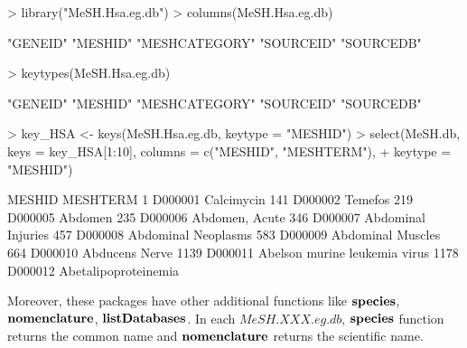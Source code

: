 \documentclass[11pt]{article}
\begin{document}
\begin{center}
\begin{Schunk}
\begin{Sinput}
> library("MeSH.Hsa.eg.db")
> columns(MeSH.Hsa.eg.db)
\end{Sinput}
\begin{Soutput}
[1] "GENEID"       "MESHID"       "MESHCATEGORY" "SOURCEID"     "SOURCEDB"    
\end{Soutput}
\begin{Sinput}
> keytypes(MeSH.Hsa.eg.db)
\end{Sinput}
\begin{Soutput}
[1] "GENEID"       "MESHID"       "MESHCATEGORY" "SOURCEID"     "SOURCEDB"    
\end{Soutput}
\begin{Sinput}
> key_HSA <- keys(MeSH.Hsa.eg.db, keytype = "MESHID")
> select(MeSH.db, keys = key_HSA[1:10], columns = c("MESHID", "MESHTERM"), 
+     keytype = "MESHID")
\end{Sinput}
\begin{Soutput}
      MESHID                      MESHTERM
1    D000001                    Calcimycin
141  D000002                       Temefos
219  D000005                       Abdomen
235  D000006                Abdomen, Acute
346  D000007            Abdominal Injuries
457  D000008           Abdominal Neoplasms
583  D000009             Abdominal Muscles
664  D000010                Abducens Nerve
1139 D000011 Abelson murine leukemia virus
1178 D000012          Abetalipoproteinemia
\end{Soutput}
\end{Schunk}
\end{center}
Moreover, these packages have other additional functions like $\bf{species}$, $\bf{nomenclature}$, $\bf{listDatabases}$.
In each $MeSH.XXX.eg.db$, $\bf{species}$ function returns the common name and $\bf{nomenclature}$ returns the scientific name.
\end{document}
